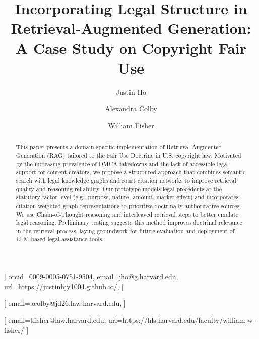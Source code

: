 \documentclass[
twocolumn
]{ceurart}
\begin{document}


\title{Incorporating Legal Structure in Retrieval-Augmented Generation: A Case Study on Copyright Fair Use}

\author[1]{Justin Ho}[%
orcid=0009-0005-0751-9504,
email=jho@g.harvard.edu,
url=https://justinhjy1004.github.io/,
]
\cormark[1]
\address[1]{Harvard Business School, Boston MA, 02163, United States of America}

\author[2]{Alexandra Colby}[%
email=acolby@jd26.law.harvard.edu,
]

\author[2]{William Fisher}[%
email=tfisher@law.harvard.edu,
url=https://hls.harvard.edu/faculty/william-w-fisher/
]

\address[2]{Harvard Law School, Boston MA, 02138, United States of America}



\begin{abstract}
  This paper presents a domain-specific implementation of Retrieval-Augmented Generation (RAG) tailored to the Fair Use Doctrine in U.S. copyright law. Motivated by the increasing prevalence of DMCA takedowns and the lack of accessible legal support for content creators, we propose a structured approach that combines semantic search with legal knowledge graphs and court citation networks to improve retrieval quality and reasoning reliability. Our prototype models legal precedents at the statutory factor level (e.g., purpose, nature, amount, market effect) and incorporates citation-weighted graph representations to prioritize doctrinally authoritative sources. We use Chain-of-Thought reasoning and interleaved retrieval steps to better emulate legal reasoning. Preliminary testing suggests this method improves doctrinal relevance in the retrieval process, laying groundwork for future evaluation and deployment of LLM-based legal assistance tools.
\end{abstract}
\end{document}
